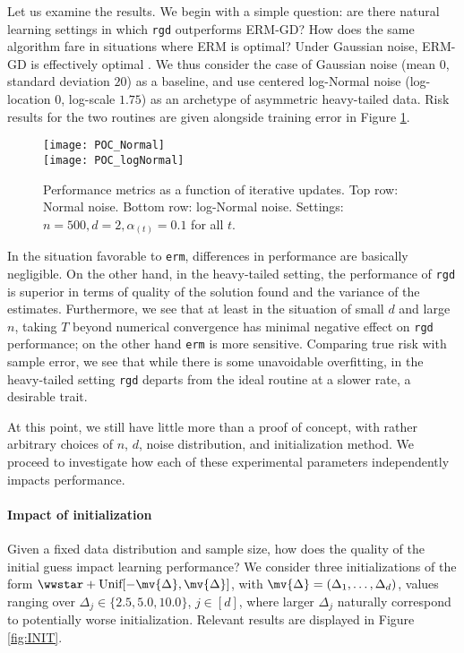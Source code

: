 \documentclass[11pt,oneside]{article}
\theoremstyle{definition} \newtheorem{defn}{Definition}       %
\theoremstyle{plain} \newtheorem{prop}[defn]{Proposition}           %
\theoremstyle{plain} \newtheorem{thm}[defn]{Theorem}                %
\theoremstyle{plain} \newtheorem{lem}[defn]{Lemma}                  %
\theoremstyle{plain} \newtheorem{cor}[defn]{Corollary}              %
\theoremstyle{remark} \newtheorem{rmk}[defn]{Remark}                %
\theoremstyle{remark} \newtheorem{ex}[defn]{Example}                %
\begin{document}
Let us examine the results. We begin with a simple question: are there natural learning settings in which \texttt{rgd} outperforms ERM-GD? How does the same algorithm fare in situations where ERM is optimal? Under Gaussian noise, ERM-GD is effectively optimal \citep[Appendix C]{lin2016a}. We thus consider the case of Gaussian noise (mean $0$, standard deviation $20$) as a baseline, and use centered log-Normal noise (log-location $0$, log-scale $1.75$) as an archetype of asymmetric heavy-tailed data. Risk results for the two routines are given alongside training error in Figure \ref{fig:POC}.

\begin{figure}[t]
\centering
\texttt{[image: POC\_Normal]}\\
\texttt{[image: POC\_logNormal]}
\caption{Performance metrics as a function of iterative updates. Top row: Normal noise. Bottom row: log-Normal noise. Settings: $n = 500, d=2, \alpha_{(t)}=0.1$ for all $t$.}
\label{fig:POC}
\end{figure}

In the situation favorable to \texttt{erm}, differences in performance are basically negligible. On the other hand, in the heavy-tailed setting, the performance of \texttt{rgd} is superior in terms of quality of the solution found and the variance of the estimates. Furthermore, we see that at least in the situation of small $d$ and large $n$, taking $T$ beyond numerical convergence has minimal negative effect on \texttt{rgd} performance; on the other hand \texttt{erm} is more sensitive. Comparing true risk with sample error, we see that while there is some unavoidable overfitting, in the heavy-tailed setting \texttt{rgd} departs from the ideal routine at a slower rate, a desirable trait.


At this point, we still have little more than a proof of concept, with rather arbitrary choices of $n$, $d$, noise distribution, and initialization method. We proceed to investigate how each of these experimental parameters independently impacts performance.


\paragraph{Impact of initialization}

Given a fixed data distribution and sample size, how does the quality of the initial guess impact learning performance? We consider three initializations of the form $\wwstar + \text{Unif}[-\mv{\Delta},\mv{\Delta}]$, with $\mv{\Delta} = (\Delta_{1},\ldots,\Delta_{d})$, values ranging over $\Delta_{j} \in \{2.5, 5.0, 10.0\}$, $j \in [d]$, where larger $\Delta_{j}$ naturally correspond to potentially worse initialization. Relevant results are displayed in Figure \ref{fig:INIT}.
\end{document}
